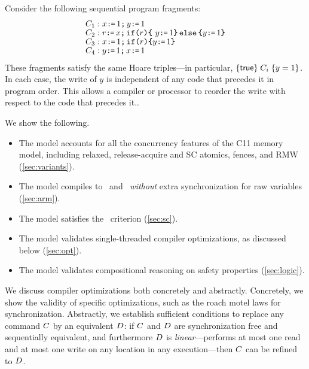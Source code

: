 Consider the following sequential program fragments:
\begin{align*}
& C_1: x \texttt{:}\mkern-1mu\texttt{=}\, 1 \texttt{;}\,\allowbreak y \texttt{:}\mkern-1mu\texttt{=}\, 1 \\[-1ex]
& C_2: r \texttt{:}\mkern-1mu\texttt{=}\, x \texttt{;}\,\allowbreak \texttt{if}\allowbreak\texttt{(}r\texttt{)} \allowbreak\texttt{\{}\ y \texttt{:}\mkern-1mu\texttt{=}\, 1 \texttt{\}}\,\allowbreak\texttt{else}\allowbreak\,\texttt{\{} y \texttt{:}\mkern-1mu\texttt{=}\, 1  \texttt{\}} \\[-1ex]
& C_3: x \texttt{:}\mkern-1mu\texttt{=}\, 1 \texttt{;}\,\allowbreak \texttt{if}\allowbreak\texttt{(}r\texttt{)} \allowbreak\texttt{\{} y \texttt{:}\mkern-1mu\texttt{=}\, 1 \texttt{\}} \\[-1ex]
&C_4:  y \texttt{:}\mkern-1mu\texttt{=}\, 1 \texttt{;}\,\allowbreak x \texttt{:}\mkern-1mu\texttt{=}\, 1
\end{align*}
These fragments satisfy the same Hoare triples---in particular, $\{\mathsf{true}\}\allowbreak\;C_i\;\allowbreak\{y =1\}$.  In each case, the write of $y$ is independent of
any code that precedes it in program order.  This allows a compiler or processor to reorder the write with respect to the code that precedes it..


We show the following.
\begin{itemize}
\item The model accounts for all the concurrency features of the C11 memory model, including relaxed, release-acquire and SC atomics, fences, and RMW
  (\textsection\ref{sec:variants}).

\item The model compiles to \armeight\ and \tso\ {\em without} extra synchronization for raw variables  (\textsection\ref{sec:arm}).

\item The model satisfies the \drfsc\ criterion  (\textsection\ref{sec:sc}).

\item The model validates single-threaded compiler optimizations, as discussed below (\textsection\ref{sec:opt}).

\item The model validates compositional reasoning on safety properties (\textsection\ref{sec:logic}).  
\end{itemize}

We discuss compiler optimizations both concretely and abstractly.
Concretely, we show the validity of specific optimizations, such as the roach motel laws for synchronization.
Abstractly, we establish sufficient conditions to replace any command $C$ by an equivalent $D$: if
$C$ and $D$ are synchronization free and sequentially equivalent, and furthermore $D$ is \emph{linear}---performs at most one read and at most one write on any location in any execution---then $C$ can be refined to $D$.  

